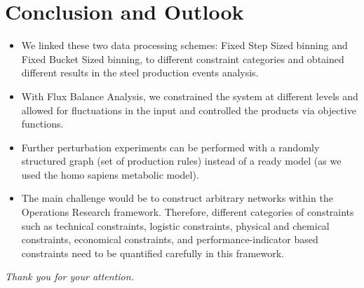 \documentclass[aspectratio=169]{beamer}
\begin{document}
\section[Conclusion and Outlook]{Conclusion and Outlook}
	\begin{frame}
		\begin{itemize}
			\item We linked these two data processing schemes: Fixed Step Sized binning and	Fixed Bucket Sized binning, to different constraint categories and obtained different results in the steel production events analysis.
			\item With Flux Balance Analysis, we constrained the system	at different levels and allowed for fluctuations in the input and controlled the products via objective functions.
			\item Further perturbation experiments can be performed with a randomly structured graph (set of production rules) instead of a ready model (as we used the homo sapiens metabolic model).
			\item The main challenge would be to construct arbitrary networks within the Operations Research framework. Therefore, different categories of constraints such as technical constraints, logistic constraints, physical and chemical constraints, economical constraints, and performance-indicator based constraints need to be quantified carefully in this framework.
		\end{itemize}
	\end{frame}

\begin{frame}{}
	\centering \Large
	\emph{Thank you for your attention.}
\end{frame}
	
\end{document}
